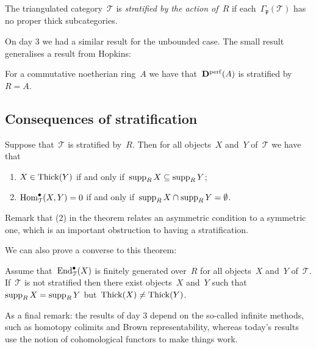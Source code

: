 \documentclass[10pt,a4paper]{article}
\begin{document}
\begin{definition}
  The triangulated category~$\mathcal{T}$ is \emph{stratified by the action of~$R$} if each~$\Gamma_{\mathfrak{p}}(\mathcal{T})$ has no proper thick subcategories.
\end{definition}

On day 3 we had a similar result for the unbounded case. The small result generalises a result from Hopkins:
\begin{example}
  For a commutative noetherian ring~$A$ we have that~$\mathbf{D}^{\mathrm{perf}}(A)$ is stratified by~$R=A$.
\end{example}

\subsection{Consequences of stratification}
\begin{theorem}
  Suppose that~$\mathcal{T}$ is stratified by~$R$. Then for all objects~$X$ and~$Y$ of~$\mathcal{T}$ we have that
  \begin{enumerate}
    \item $X\in\operatorname{Thick}(Y)$ if and only if~$\operatorname{supp}_R X\subseteq\operatorname{supp}_R Y$;
    \item $\operatorname{Hom}_{\mathcal{T}}^\bullet(X,Y)=0$ if and only if~$\operatorname{supp}_R X\cap\operatorname{supp}_R Y=\emptyset$.
  \end{enumerate}
\end{theorem}
Remark that (2) in the theorem relates an asymmetric condition to a symmetric one, which is an important obstruction to having a stratification.

We can also prove a converse to this theorem:
\begin{proposition}
  Assume that~$\operatorname{End}_{\mathcal{T}}^\bullet(X)$ is finitely generated over~$R$ for all objects~$X$ and~$Y$ of~$\mathcal{T}$. If~$\mathcal{T}$ is not stratified then there exist objects~$X$ and~$Y$ such that~$\operatorname{supp}_R X=\operatorname{supp}_R Y$ but~$\operatorname{Thick}(X)\neq\operatorname{Thick}(Y)$.
\end{proposition}

As a final remark: the results of day 3 depend on the so-called infinite methods, such as homotopy colimits and Brown representability, whereas today's results use the notion of cohomological functors to make things work.
\end{document}
